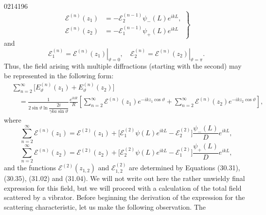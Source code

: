\begin{scanpage}{0214}{196}
\[\left.\begin{aligned}
\mathcal E^{(n)}(z_1)&=-\mathcal E_2^{(n-1)}\psi_-(L)e^{ikL},\\
\mathcal E^{(n)}(z_2)&=-\mathcal E_1^{(n-1)}\psi_+(L)e^{ikL}
\end{aligned}\right\}\tag{31.15}\]
and
\[\mathcal E_1^{(n)}=\left.\mathcal E^{(n)}(z_1)\right|_{\vartheta=0},\quad\mathcal E_2^{(n)}=\left.\mathcal E^{(n)}(z_2)\right|_{\vartheta=\pi}.\tag{31.16}\]
Thus, the field arising with multiple diffractions (starting with the second) may be represented in the following form:
\[\begin{aligned}
&\sum_{n=2}^\infty\bigl[E_\vartheta^{(n)}(z_1)+E_\vartheta^{(n)}(z_2)\bigr]\\
&\quad=\frac{1}{2\sin\vartheta\ln\dfrac{2i}{\gamma ka\sin\vartheta}}\frac{e^{ikR}}R
\left[\sum_{n=2}^\infty\mathcal E^{(n)}(z_1)e^{-ikz_1\cos\vartheta}
+\sum_{n=2}^\infty\mathcal E^{(n)}(z_2)e^{-ikz_2\cos\vartheta}\right],
\end{aligned}\tag{31.17}\]
where
\[\sum_{n=2}^\infty\mathcal E^{(n)}(z_1)=\mathcal E^{(2)}(z_1)+\bigl[\mathcal E_1^{(2)}\psi(L)e^{ikL}-\mathcal E_2^{(2)}\bigr]\frac{\psi_-(L)}D e^{ikL},\tag{31.18}\]
\[\sum_{n=2}^\infty\mathcal E^{(n)}(z_2)=\mathcal E^{(2)}(z_2)+\bigl[\mathcal E_2^{(2)}\psi(L)e^{ikL}-\mathcal E_1^{(2)}\bigr]\frac{\psi_+(L)}D e^{ikL},\tag{31.19}\]
and the functions $\mathcal E^{(2)}(z_{1,2})$ and $\mathcal E_{1,2}^{(2)}$ are determined by Equations (30.31), (30.35), (31.02) and (31.04). We will not write out here the rather unwieldy final expression for this field, but we will proceed with a calculation of the total field scattered by a vibrator.
Before beginning the derivation of the expression for the scattering characteristic, let us make the following observation. The
\end{scanpage}
